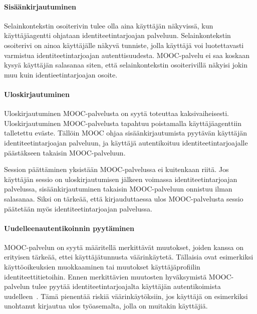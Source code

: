 \documentclass[finnish,gradu]{tktltiki}
\begin{document}
  \paragraph{Sisäänkirjautuminen} \hfill %
  \label{par:sisäänkirjautuminen}

  Selainkontekstin osoiterivin tulee olla aina käyttäjän näkyvissä, kun käyttäjäagentti ohjataan identiteetintarjoajan palveluun. Selainkontekstin osoiterivi on ainoa käyttäjälle näkyvä tunniste, jolla käyttäjä voi luotettavasti varmistua identiteetintarjoajan autenttisuudesta. MOOC-palvelu ei saa koskaan kysyä käyttäjän salasanaa siten, että selainkontekstin osoiterivillä näkyisi jokin muu kuin identieetintarjoajan osoite.


  \paragraph{Uloskirjautuminen} \hfill %
  \label{par:uloskirjautumisesta}

  Uloskirjautuminen MOOC-palvelusta on syytä toteuttaa kaksivaiheisesti. Uloskirjautuminen MOOC-palvelusta tapahtuu poistamalla käyttäjäagenttiin talletettu eväste. Tällöin MOOC ohjaa sisäänkirjautumista pyytävän käyttäjän identiteetintarjoajan palveluun, ja käyttäjä autentikoituu identiteetintarjoajalle päästäkseen takaisin MOOC-palveluun.

  Session päättäminen yksistään MOOC-palvelussa ei kuitenkaan riitä. Jos käyttäjän sessio on uloskirjautumisen jälkeen voimassa identiteetintarjoajan palvelussa, sisäänkirjautuminen takaisin MOOC-palveluun onnistuu ilman salasanaa. Siksi on tärkeää, että kirjauduttaessa ulos MOOC-palvelusta sessio päätetään myös identiteetintarjoajan palvelussa.


  \paragraph{Uudelleenautentikoinnin pyytäminen} \hfill %
  \label{par:pakotettu_uudelleenautentikointi}

  MOOC-palvelun on syytä määritellä merkittävät muutokset, joiden kanssa on erityisen tärkeää, ettei käyttäjätunnusta väärinkäytetä. Tällaisia ovat esimerkiksi käyttöoikeuksien muokkaaminen tai muutokset käyttäjäprofiilin identiteettitietoihin. Ennen merkittävien muutosten hyväksymistä MOOC-palvelun tulee pyytää identiteetintarjoajalta käyttäjän autentikoimista uudelleen~\cite{facebook_oauth2_reauth, google_oauth2_webserver}. Tämä pienentää riskiä väärinkäytöksiin, jos käyttäjä on esimerkiksi unohtanut kirjautua ulos työasemalta, jolla on muitakin käyttäjiä.
\end{document}

